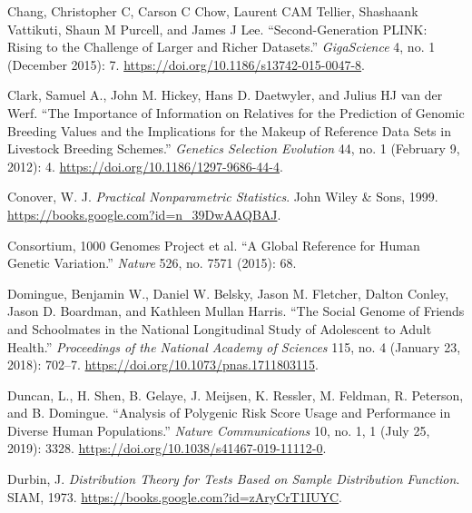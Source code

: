 \documentclass[
]{book}
\newlength{\cslhangindent}
\newlength{\cslentryspacingunit} %
\newenvironment{CSLReferences}[2] %
 {%
  \setlength{\parindent}{0pt}
  \ifodd #1
  \let\oldpar\par
  \def\par{\hangindent=\cslhangindent\oldpar}
  \fi
  \setlength{\parskip}{#2\cslentryspacingunit}
 }%
 {}
\begin{document}
\begin{CSLReferences}{1}{0}
\leavevmode{}%
Chang, Christopher C, Carson C Chow, Laurent CAM Tellier, Shashaank Vattikuti, Shaun M Purcell, and James J Lee. {``Second-Generation {PLINK}: Rising to the Challenge of Larger and Richer Datasets.''} \emph{GigaScience} 4, no. 1 (December 2015): 7. \url{https://doi.org/10.1186/s13742-015-0047-8}.

\leavevmode{}%
Clark, Samuel A., John M. Hickey, Hans D. Daetwyler, and Julius HJ van der Werf. {``The Importance of Information on Relatives for the Prediction of Genomic Breeding Values and the Implications for the Makeup of Reference Data Sets in Livestock Breeding Schemes.''} \emph{Genetics Selection Evolution} 44, no. 1 (February 9, 2012): 4. \url{https://doi.org/10.1186/1297-9686-44-4}.

\leavevmode{}%
Conover, W. J. \emph{Practical {Nonparametric Statistics}}. {John Wiley \& Sons}, 1999. \url{https://books.google.com?id=n_39DwAAQBAJ}.

\leavevmode{}%
Consortium, 1000 Genomes Project et al. {``A Global Reference for Human Genetic Variation.''} \emph{Nature} 526, no. 7571 (2015): 68.

\leavevmode{}%
Domingue, Benjamin W., Daniel W. Belsky, Jason M. Fletcher, Dalton Conley, Jason D. Boardman, and Kathleen Mullan Harris. {``The Social Genome of Friends and Schoolmates in the {National Longitudinal Study} of {Adolescent} to {Adult Health}.''} \emph{Proceedings of the National Academy of Sciences} 115, no. 4 (January 23, 2018): 702--7. \url{https://doi.org/10.1073/pnas.1711803115}.

\leavevmode{}%
Duncan, L., H. Shen, B. Gelaye, J. Meijsen, K. Ressler, M. Feldman, R. Peterson, and B. Domingue. {``Analysis of Polygenic Risk Score Usage and Performance in Diverse Human Populations.''} \emph{Nature Communications} 10, no. 1, 1 (July 25, 2019): 3328. \url{https://doi.org/10.1038/s41467-019-11112-0}.

\leavevmode{}%
Durbin, J. \emph{Distribution {Theory} for {Tests Based} on {Sample Distribution Function}}. {SIAM}, 1973. \url{https://books.google.com?id=zAryCrT1IUYC}.


\end{CSLReferences}
\end{document}
